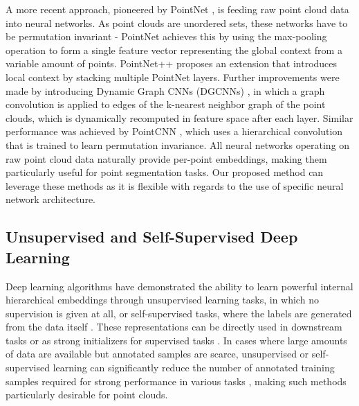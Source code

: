\documentclass{article}
\begin{document}
A more recent approach, pioneered by PointNet \cite{pointnet}, is feeding raw point cloud data into neural networks. As point clouds are unordered sets, these networks have to be permutation invariant - PointNet achieves this by using the max-pooling operation to form a single feature vector representing the global context from a variable amount of points. PointNet++ \cite{pointnet++} proposes an extension that introduces local context by stacking multiple PointNet layers. Further improvements were made by introducing Dynamic Graph CNNs (DGCNNs) \cite{dgcnn}, in which a graph convolution is applied to edges of the k-nearest neighbor graph of the point clouds, which is dynamically recomputed in feature space after each layer. Similar performance was achieved by PointCNN \cite{pointcnn}, which uses a hierarchical convolution that is trained to learn permutation invariance. All neural networks operating on raw point cloud data naturally provide per-point embeddings, making them particularly useful for point segmentation tasks. Our proposed method can leverage these methods as it is flexible with regards to the use of specific neural network architecture.


\subsection{Unsupervised and Self-Supervised Deep Learning}

Deep learning algorithms have demonstrated the ability to learn powerful internal hierarchical embeddings through unsupervised learning tasks, in which no supervision is given at all, or self-supervised tasks, where the labels are generated from the data itself \cite{unsupervised, contextprediction, rotation}. These representations can be directly used in downstream tasks or as strong initializers for supervised tasks \cite{wordvectors, unsupervised2}. In cases where large amounts of data are available but annotated samples are scarce, unsupervised or self-supervised learning can significantly reduce the number of annotated training samples required for strong performance in various tasks \cite{foldingnet}, making such methods particularly desirable for point clouds. 
\end{document}
